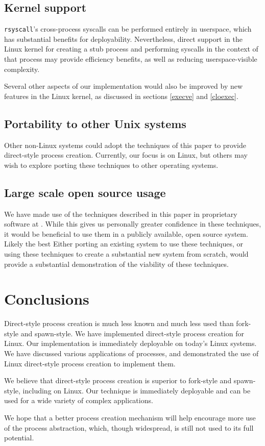 \documentclass[letterpaper,twocolumn,10pt]{article}
\begin{document}
\subsection{Kernel support}
\texttt{rsyscall}'s cross-process syscalls can be performed entirely in userspace,
which has substantial benefits for deployability.
Nevertheless, direct support in the Linux kernel
for creating a stub process and performing syscalls in the context of that process
may provide efficiency benefits, as well as reducing userspace-visible complexity.

Several other aspects of our implementation would also be improved by new features in the Linux kernel,
as discussed in sections \ref{execve} and \ref{cloexec}.
\subsection{Portability to other Unix systems}
Other non-Linux systems
could adopt the techniques of this paper
to provide direct-style process creation.
Currently, our focus is on Linux,
but others may wish to explore porting these techniques to other operating systems.
\subsection{Large scale open source usage}
We have made use of the techniques described in this paper
in proprietary software at \twosigma.
While this gives us personally greater confidence in these techniques,
it would be beneficial to use them in a publicly available, open source system.
Likely the best 
Either porting an existing system to use these techniques,
or using these techniques to create a substantial new system from scratch,
would provide a substantial demonstration of the viability of these techniques.
\section{Conclusions}\label{conclusions}
Direct-style process creation is much less known and much less used than fork-style and spawn-style.
We have implemented direct-style process creation for Linux.
Our implementation is immediately deployable on today's Linux systems.
We have discussed various applications of processes,
and demonstrated the use of Linux direct-style process creation
to implement them.

We believe that direct-style process creation is superior to fork-style and spawn-style,
including on Linux.
Our technique is immediately deployable and can be used for a wide variety of complex applications.

We hope that a better process creation mechanism
will help encourage more use of the process abstraction,
which, though widespread,
is still not used to its full potential.



\end{document}
